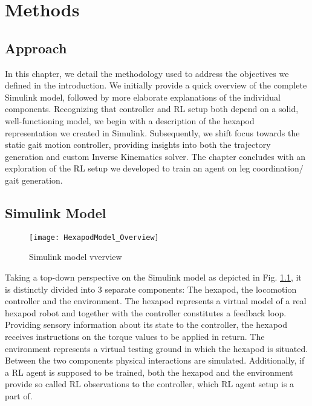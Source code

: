 \chapter{Methods}
\label{ch:methods}

\section{Approach}	
In this chapter, we detail the methodology used to address the objectives we defined in the introduction.
We initially provide a quick overview of the complete Simulink model, followed by more elaborate explanations of the individual components.
Recognizing that controller and RL setup both depend on a solid, well-functioning model, we begin with a description of the hexapod representation we created in Simulink.
Subsequently, we shift focus towards the static gait motion controller, providing insights into both the trajectory generation and custom Inverse Kinematics solver.
The chapter concludes with an exploration of the RL setup we developed to train an agent on leg coordination/ gait generation.

\section{Simulink Model}

\begin{figure}[h]
	\centerline{\texttt{[image: HexapodModel\_Overview]}}
	\caption[]{Simulink model vverview}
	\label{figure: Simulink Model Overview}
\end{figure}

Taking a top-down perspective on the Simulink model as depicted in Fig. \ref{figure: Simulink Model Overview}, it is distinctly divided into 3 separate components: The hexapod, the locomotion controller and the environment.
The hexapod represents a virtual model of a real hexapod robot and together with the controller constitutes a feedback loop.
Providing sensory information about its state to the controller, the hexapod receives instructions on the torque values to be applied in return.
The environment represents a virtual testing ground in which the hexapod is situated.
Between the two components physical interactions are simulated.
Additionally, if a RL agent is supposed to be trained, both the hexapod and the environment provide so called RL observations to the controller, which RL agent setup is a part of.


